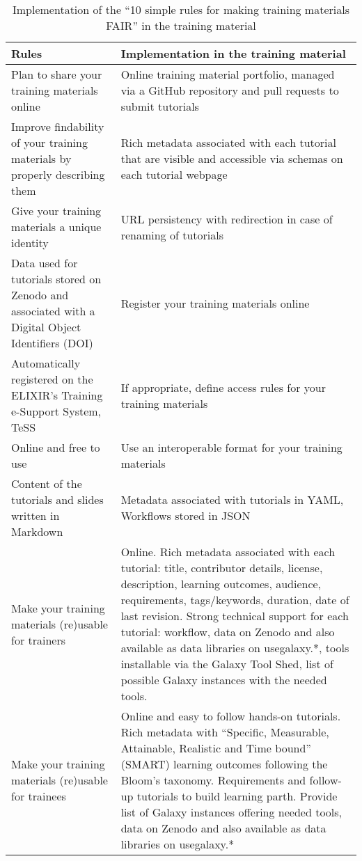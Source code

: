 \documentclass[10pt,letterpaper]{article}
\begin{document}
\begin{table}[]
	\centering
	\caption{Implementation of the ``10 simple rules for making training materials FAIR'' in the training material\label{tbl:rulesforfair}}
	\begin{tabular}{p{}p{}}
		Rules                                                                                            & Implementation in the training material\\\hline
		Plan to share your training materials online                                                     & Online training material portfolio, managed via a GitHub repository and pull requests to submit tutorials\\
		Improve findability of your training materials by properly describing them                       & Rich metadata associated with each tutorial that are visible and accessible via schemas on each tutorial webpage\\
		Give your training materials a unique identity                                                   & URL persistency with redirection in case of renaming of tutorials\\
		Data used for tutorials stored on Zenodo  and associated with a Digital Object Identifiers (DOI) & Register your training materials online\\
		Automatically registered on the ELIXIR's Training e-Support System, TeSS                         & If appropriate, define access rules for your training materials\\
		Online and free to use                                                                           & Use an interoperable format for your training materials\\
		Content of the tutorials and slides written in Markdown                                          & Metadata associated with tutorials in YAML, Workflows stored in JSON\\
		Make your training materials (re)usable for trainers                                             & Online. Rich metadata associated with each tutorial: title, contributor details, license, description, learning outcomes, audience, requirements, tags/keywords, duration, date of last revision. Strong technical support for each tutorial: workflow, data on Zenodo and also available as data libraries on usegalaxy.*, tools installable via the Galaxy Tool Shed, list of possible Galaxy instances with the needed tools.\\
		Make your training materials (re)usable for trainees                                             & Online and easy to follow hands-on tutorials. Rich metadata with ``Specific, Measurable, Attainable, Realistic and Time bound'' (SMART) learning outcomes following the Bloom's taxonomy. Requirements and follow-up tutorials to build learning parth. Provide list of Galaxy instances offering needed tools, data on Zenodo and also available as data libraries on usegalaxy.*\\

\end{tabular}
\end{table}
\end{document}
